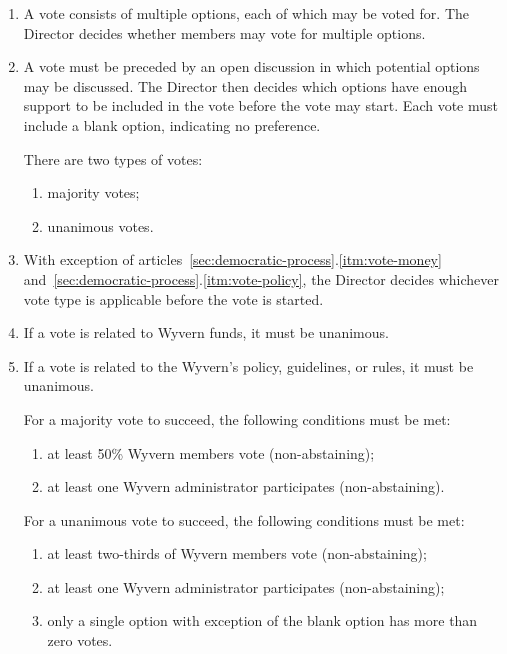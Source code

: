\begin{enumerate}
    \item A vote consists of multiple options, each of which may be voted for. The Director decides whether members may vote for multiple options.
    
    \item A vote must be preceded by an open discussion in which potential options may be discussed. The Director then decides which options have enough support to be included in the vote before the vote may start. Each vote must include a blank option, indicating no preference.

    \begin{item}
        There are two types of votes:
        \begin{enumerate}
            \item majority votes;
            \item unanimous votes.
        \end{enumerate}
    \end{item}

    \item With exception of articles~\ref{sec:democratic-process}.\ref{itm:vote-money} and~\ref{sec:democratic-process}.\ref{itm:vote-policy}, the Director decides whichever vote type is applicable before the vote is started.

    \item \label{itm:vote-money} If a vote is related to Wyvern funds, it must be unanimous.

    \item \label{itm:vote-policy} If a vote is related to the Wyvern's policy, guidelines, or rules, it must be unanimous.

    \begin{item}
        For a majority vote to succeed, the following conditions must be met:
        \begin{enumerate}
            \item at least 50\% Wyvern members vote (non-abstaining);
            \item at least one Wyvern administrator participates (non-abstaining).
        \end{enumerate}
    \end{item}

    \begin{item}
        For a unanimous vote to succeed, the following conditions must be met:
        \begin{enumerate}
            \item at least two-thirds of Wyvern members vote (non-abstaining);
            \item at least one Wyvern administrator participates (non-abstaining);
            \item only a single option with exception of the blank option has more than zero votes.
        \end{enumerate}
    \end{item}


\end{enumerate}
